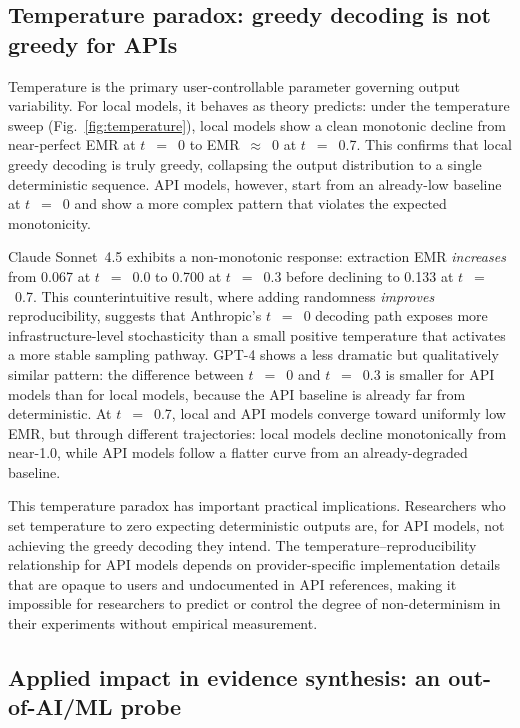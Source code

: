 \documentclass[sn-nature]{sn-jnl}
\begin{document}
\subsection{Temperature paradox: greedy decoding is not greedy for APIs}\label{subsec:temperature}

Temperature is the primary user-controllable parameter governing output variability.
For local models, it behaves as theory predicts: under the temperature sweep (Fig.~\ref{fig:temperature}), local models show a clean monotonic decline from near-perfect EMR at $t$~$=$~0 to EMR~$\approx$~0 at $t$~$=$~0.7.
This confirms that local greedy decoding is truly greedy, collapsing the output distribution to a single deterministic sequence.
API models, however, start from an already-low baseline at $t$~$=$~0 and show a more complex pattern that violates the expected monotonicity.

Claude Sonnet~4.5 exhibits a non-monotonic response: extraction EMR \emph{increases} from 0.067 at $t$~$=$~0.0 to 0.700 at $t$~$=$~0.3 before declining to 0.133 at $t$~$=$~0.7.
This counterintuitive result, where adding randomness \emph{improves} reproducibility, suggests that Anthropic's $t$~$=$~0 decoding path exposes more infrastructure-level stochasticity than a small positive temperature that activates a more stable sampling pathway.
GPT-4 shows a less dramatic but qualitatively similar pattern: the difference between $t$~$=$~0 and $t$~$=$~0.3 is smaller for API models than for local models, because the API baseline is already far from deterministic.
At $t$~$=$~0.7, local and API models converge toward uniformly low EMR, but through different trajectories: local models decline monotonically from near-1.0, while API models follow a flatter curve from an already-degraded baseline.

This temperature paradox has important practical implications.
Researchers who set temperature to zero expecting deterministic outputs are, for API models, not achieving the greedy decoding they intend.
The temperature--reproducibility relationship for API models depends on provider-specific implementation details that are opaque to users and undocumented in API references\cite{openai2024seed}, making it impossible for researchers to predict or control the degree of non-determinism in their experiments without empirical measurement.


\subsection{Applied impact in evidence synthesis: an out-of-AI/ML probe}\label{subsec:pubmed}
\end{document}
